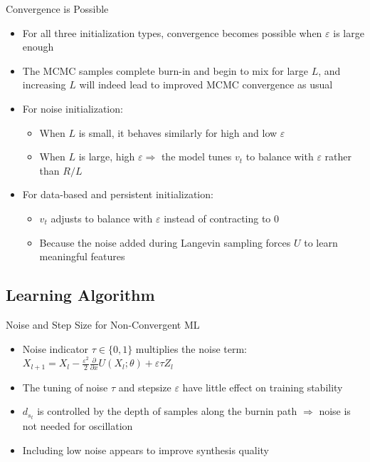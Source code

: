 \documentclass{beamer}
\begin{document}
\begin{frame}{Convergence is Possible}
\begin{itemize}
\item For all three initialization types, convergence becomes possible when $\varepsilon$ is large enough
\item The MCMC samples
complete burn-in and begin to mix for large $L$, and increasing
$L$ will indeed lead to improved MCMC convergence as
usual
\item For noise initialization:
\begin{itemize}
\item When $L$ is small, it behaves similarly for high and low $\varepsilon$
\item When $L$ is large, high $\varepsilon\Rightarrow$ the model tunes $v_t$ to balance with $\varepsilon$ rather than $R/L$
\end{itemize}
\item For data-based and persistent initialization:
\begin{itemize}
\item $v_t$ adjusts to balance with $\varepsilon$ instead of contracting to $0$
\item Because the noise added during Langevin sampling forces
$U$ to learn meaningful features
\end{itemize}
\end{itemize}
\end{frame}

\subsection{Learning Algorithm}
\begin{frame}{Noise and Step Size for Non-Convergent ML}
\begin{itemize}
\item Noise indicator $\tau\in\{0,1\}$ multiplies the noise term: $X_{l+1}=X_l-\frac{\varepsilon^2}{2}\frac{\partial}{\partial x}U(X_l;\theta)+\varepsilon\tau Z_l$
\item The tuning of noise $\tau$ and stepsize $\varepsilon$
have little effect on training stability
\item $d_{s_t}$ is controlled by the depth of samples along the burnin
path $\Rightarrow$ noise is not needed for oscillation
\item Including low noise appears to improve synthesis
quality
\end{itemize}
\end{frame}
\end{document}
